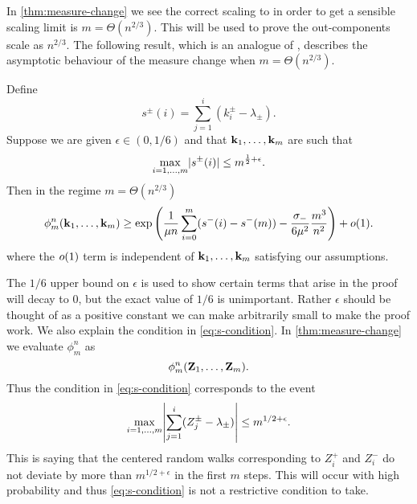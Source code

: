 In \cref{thm:measure-change} we see the correct scaling to in order to get a sensible scaling limit is $m = \Theta(n^{2/3})$. This will be used to prove the out-components scale as $n^{2/3}$. The following result, which is an analogue of \cite[Lemma 6.7]{conchon--kerjanStableGraphMetric2020}, describes the asymptotic behaviour of the measure change when $m = \Theta(n^{2/3})$.
\begin{lemma}
    \label{lem:measure-change-approx}
    Define
    \begin{equation*}
        s^{\pm}(i) = \textstyle{\sum_{j=1}^i (k_i^{\pm} - \lambda_{\pm})}.
    \end{equation*}
    Suppose we are given $\epsilon \in (0, 1/6)$ and that ${\mathbf k}_1, \ldots, {\mathbf k}_m$ are such that
    \begin{equation}
        \label{eq:s-condition}
        \max_{i=1, \ldots, m} \lvert s^{\pm}(i)\rvert \leq m^{\frac{1}{2} + \epsilon}.
    \end{equation}
    Then in the regime $m = \Theta(n^{2/3})$
    \begin{equation*}
        \phi^n_m({\mathbf k}_1, \ldots, {\mathbf k}_m)
        \geq \exp\left( \frac{1}{\mu n} \sum_{i=0}^m (s^-(i) - s^-(m)) - \frac{\sigma_-}{6 \mu^2} \frac{m^3}{n^2} \right) + o(1).
    \end{equation*}
    where the $o(1)$ term is independent of ${\mathbf k}_1, \ldots, {\mathbf k}_m$ satisfying our assumptions.
\end{lemma}
The $1/6$ upper bound on $\epsilon$ is used to show certain terms that arise in the proof will decay to 0, but the exact value of $1/6$ is unimportant. Rather $\epsilon$ should be thought of as a positive constant we can make arbitrarily small to make the proof work. We also explain the condition in \cref{eq:s-condition}. In \cref{thm:measure-change} we evaluate $\phi^n_m$ as 
\begin{equation*}
    \phi^n_m({\mathbf Z}_1, \ldots, {\mathbf Z}_m).
\end{equation*}
Thus the condition in \cref{eq:s-condition} corresponds to the event
\begin{equation*}
    \max_{i=1, \ldots, m } \abs*{
        \sum_{j=1}^i (Z^{\pm}_j - \lambda_{\pm}) 
    } \leq m^{1/2 + \epsilon}.
\end{equation*}
This is saying that the centered random walks corresponding to $Z^+_i$ and $Z^-_i$ do not deviate by more than $m^{1/2 + \epsilon}$ in the first $m$ steps. This will occur with high probability and thus \cref{eq:s-condition} is not a restrictive condition to take.


